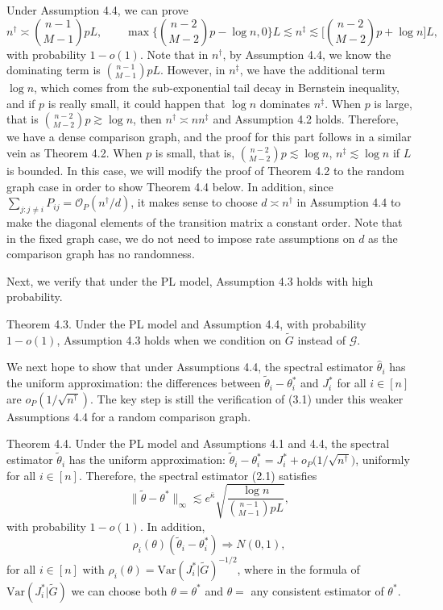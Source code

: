 Under Assumption 4.4, we can prove
\[
n^{\dagger}\asymp \binom{n-1}{M-1}p L,\qquad\max \Big\{\binom{n-2}{M-2}p-\log n,0\Big\}L\lesssim n^{\ddagger}\lesssim\Big[\binom{n-2}{M-2}p+\log n\Big]L,
\]
with probability \(1 - o(1)\). Note that in \(n^{\dagger}\), by Assumption 4.4, we know the dominating term is \(\binom{n- 1}{M- 1}p L\). However, in \(n^{\ddagger}\), we have the additional term \(\log n\), which comes from the sub-exponential tail decay in Bernstein inequality, and if \(p\) is really small, it could happen that \(\log n\) dominates \(n^{\ddagger}\). When \(p\) is large, that is \(\binom{n- 2}{M- 2}p\gtrsim\log n\), then \(n^{\dagger}\asymp n n^{\ddagger}\) and Assumption 4.2 holds. Therefore, we have a dense comparison graph, and the proof for this part follows in a similar vein as Theorem 4.2. When \(p\) is small, that is, \(\binom{n- 2}{M- 2}p\lesssim\log n\), \(n^{\ddagger}\lesssim\log n\) if \(L\) is bounded. In this case, we will modify the proof of Theorem 4.2 to the random graph case in order to show Theorem 4.4 below. In addition, since \(\sum_{j:j\neq i}P_{i j} = \mathcal{O}_{P}(n^{\dagger} / d)\), it makes sense to choose \(d\asymp n^{\dagger}\) in Assumption 4.4 to make the diagonal elements of the transition matrix a constant order. Note that in the fixed graph case, we do not need to impose rate assumptions on \(d\) as the comparison graph has no randomness.

Next, we verify that under the PL model, Assumption 4.3 holds with high probability.

Theorem 4.3. Under the PL model and Assumption 4.4, with probability \(1 - o(1)\), Assumption 4.3 holds when we condition on \(\widetilde{G}\) instead of \(\mathcal{G}\).

We next hope to show that under Assumptions 4.4, the spectral estimator \(\widehat{\theta}_{i}\) has the uniform approximation: the differences between \(\widetilde{\theta}_{i} - \theta_{i}^{*}\) and \(J_{i}^{*}\) for all \(i\in [n]\) are \(o_{P}(1 / \sqrt{n^{\dagger}})\). The key step is still the verification of (3.1) under this weaker Assumptions 4.4 for a random comparison graph.

Theorem 4.4. Under the PL model and Assumptions 4.1 and 4.4, the spectral estimator \(\widetilde{\theta}_{i}\) has the uniform approximation: \(\widetilde{\theta}_{i} - \theta_{i}^{*} = J_{i}^{*} + o_{P}\big(1 / \sqrt{n^{\dagger}}\big)\), uniformly for all \(i\in [n]\). Therefore, the spectral estimator (2.1) satisfies
\[
\| \widetilde{\theta} -\theta^{*}\|_{\infty}\lesssim e^{\bar{\kappa}}\sqrt{\frac{\log n}{\binom{n - 1}{M - 1}pL}}, \tag{4.5}
\]
with probability \(1 - o(1)\). In addition,
\[
\rho_{i}(\theta)(\widetilde{\theta}_{i} - \theta_{i}^{*})\Rightarrow N(0,1),
\]
for all \(i\in [n]\) with \(\rho_{i}(\theta) = \mathrm{Var}(J_{i}^{*}|\widetilde{G})^{- 1 / 2}\), where in the formula of \(\mathrm{Var}(J_{i}^{*}|\widetilde{G})\) we can choose both \(\theta = \theta^{*}\) and \(\theta =\) any consistent estimator of \(\theta^{*}\).

